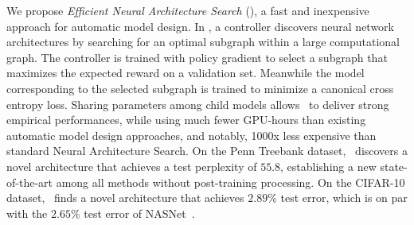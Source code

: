 We propose \textit{Efficient Neural Architecture Search} (\enas), a fast and inexpensive approach for automatic model design. In \enas, a controller discovers neural network architectures by searching for an optimal subgraph within a large computational graph. The controller is trained with policy gradient to select a subgraph that maximizes the expected reward on a validation set. Meanwhile the model corresponding to the selected subgraph is trained to minimize a canonical cross entropy loss. Sharing parameters among child models allows \enas~to deliver strong empirical performances, while using much fewer GPU-hours than existing automatic model design approaches, and notably, 1000x less expensive than standard Neural Architecture Search. On the Penn Treebank dataset, \enas~discovers a novel architecture that achieves a test perplexity of $55.8$, establishing a new state-of-the-art among all methods without post-training processing. On the CIFAR-10 dataset, \enas~finds a novel architecture that achieves $2.89\%$ test error, which is on par with the $2.65\%$ test error of NASNet~\citep{nas_module}.